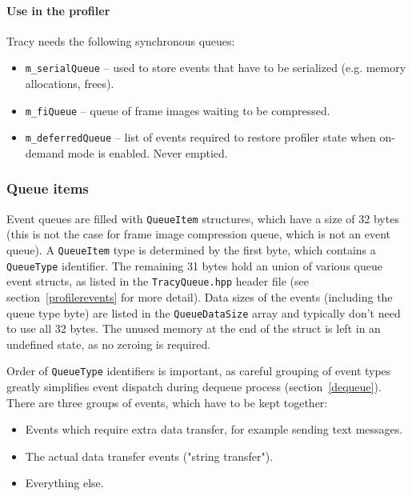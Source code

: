 \documentclass[hidelinks,titlepage,a4paper]{article}
\begin{document}
\paragraph{Use in the profiler}

Tracy needs the following synchronous queues:

\begin{itemize}
\item \texttt{m\_serialQueue} -- used to store events that have to be serialized (e.g. memory allocations, frees).
\item \texttt{m\_fiQueue} -- queue of frame images waiting to be compressed.
\item \texttt{m\_deferredQueue} -- list of events required to restore profiler state when on-demand mode is enabled. Never emptied.
\end{itemize}

\subsubsection{Queue items}
\label{queueitems}

Event queues are filled with \texttt{QueueItem} structures, which have a size of 32 bytes (this is not the case for frame image compression queue, which is not an event queue). A \texttt{QueueItem} type is determined by the first byte, which contains a \texttt{QueueType} identifier. The remaining 31 bytes hold an union of various queue event structs, as listed in the \texttt{TracyQueue.hpp} header file (see section~\ref{profilerevents} for more detail). Data sizes of the events (including the queue type byte) are listed in the \texttt{QueueDataSize} array and typically don't need to use all 32 bytes. The unused memory at the end of the struct is left in an undefined state, as no zeroing is required.

Order of \texttt{QueueType} identifiers is important, as careful grouping of event types greatly simplifies event dispatch during dequeue process (section~\ref{dequeue}). There are three groups of events, which have to be kept together:

\begin{itemize}
\item Events which require extra data transfer, for example sending text messages.
\item The actual data transfer events ("string transfer").
\item Everything else.
\end{itemize}
\end{document}
